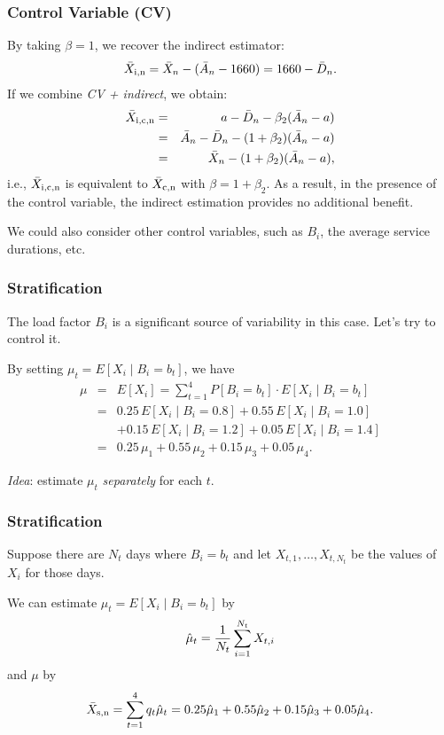 \documentclass[t,usepdftitle=false]{beamer}
\begin{document}
\begin{frame}
	\frametitle{Control Variable (CV)}
	
	By taking \(\beta=1\), we recover the indirect estimator:
	\[
	\bar X_{\rm{i},n} = \bar X_n - (\bar A_n - 1660) = 1660 - \bar D_n.
	\]
	If we combine \emph{CV + indirect}, we obtain:
	\begin{eqnarray*}
		{\bar X_{\rm{i},\rm{c},n}} &=& a - \bar D_n - \beta_2 (\bar A_n - a) \\
		&=& \bar A_n - \bar D_n -(1+\beta_2)(\bar A_n - a) \\
		&=& \bar X_n -(1+\beta_2)(\bar A_n - a),
	\end{eqnarray*}
	i.e., \(\bar X_{\rm{i},\rm{c},n}\) is equivalent to \(\bar X_{\rm{c},n}\) 
	with \(\beta = 1+\beta_2\).
	As a result, in the presence of the control variable, the indirect estimation provides no additional benefit.
	
	\mbox{}
	
	We could also consider other control variables, such as \(B_i\), the average service durations, etc.
	
\end{frame}

\begin{frame}
	\frametitle{Stratification}
	
	The load factor \(B_i\) is a significant source of variability in this case. Let's try to control it.
	
	\mbox{}
	
	By setting \(\mu_t = E[X_i\mid B_i=b_t]\), we have
	\begin{eqnarray*}
		\mu &=& E[X_i]  = \sum_{t=1}^4 P[B_i = b_t] \cdot E[X_i\mid B_i=b_t] \\
		&=&  0.25\, E[X_i\mid B_i=0.8] + 0.55\, E[X_i\mid B_i=1.0]  \\
		&& + 0.15\, E[X_i\mid B_i=1.2] + 0.05\, E[X_i\mid B_i=1.4]  \\
		&=&  0.25\,\mu_1 + 0.55\, \mu_2 + 0.15\, \mu_3 + 0.05\, \mu_4.
	\end{eqnarray*}
	
	\mbox{}
	
	\emph{Idea}: estimate \(\mu_t\) \emph{separately} 
	for each \(t\).
	
\end{frame}

\begin{frame}
	\frametitle{Stratification}
	
	Suppose there are \(N_t\) days where \(B_i = b_t\) and let
	\(X_{t,1},\dots, X_{t,N_t}\) be the values of \(X_i\) for those days. 
	
	\mbox{}
	
	We can estimate \(\mu_t = E[X_i\mid B_i=b_t]\) by
	$$ {\hat\mu_t} = {1\over N_t} \sum_{i=1}^{N_t} X_{t,i} $$
	and \(\mu\) by
	\[
	{\bar X_{\rm{s},n}} = \sum_{t=1}^4 q_t \hat\mu_t 
	= 0.25 \hat\mu_1 + 0.55 \hat\mu_2 + 0.15 \hat\mu_3 + 0.05 \hat\mu_4.
	\]
	
\end{frame}
\end{document}
